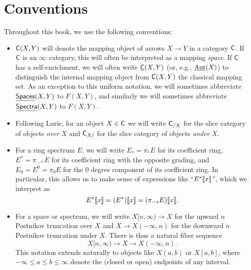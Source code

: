 
\section{Conventions}

Throughout this book, we use the following conventions:

\begin{itemize}
\item $\mathsf{C}(X, Y)$ will denote the mapping object of arrows $X \to Y$ in a category $\mathsf{C}$.  If $\mathsf{C}$ is an $\infty$--category, this will often be interpreted as a mapping \emph{space}.  If $\mathsf{C}$ has a self-enrichment, we will often write $\underline{\mathsf{C}}(X, Y)$ (or, e.g., $\operatorname{\underline{\smash{\operatorname{Aut}}}}(X)$) to distinguish the internal mapping object from $\mathsf{C}(X, Y)$ the classical mapping set.  As an exception to this uniform notation, we will sometimes abbreviate $\underline{\mathsf{Spaces}}(X, Y)$ to $F(X, Y)$, and similarly we will sometimes abbreviate $\underline{\mathsf{Spectra}}(X, Y)$ to $F(X, Y)$.
\item Following Lurie, for an object $X \in \mathsf{C}$ we will write $\mathsf{C}_{/X}$ for the slice category of objects \emph{over} $X$ and $\mathsf{C}_{X/}$ for the slice category of objects \emph{under} $X$.
\item For a ring spectrum $E$, we will write $E_* = \pi_* E$ for its coefficient ring, $E^* = \pi_{-*} E$ for its coefficient ring with the opposite grading, and $E_0 = E^0 = \pi_0 E$ for the $0${\th} degree component of its coefficient ring.  In particular, this allows us to make sense of expressions like ``$E^*\llbracket{x}\rrbracket$'', which we interpret as \[E^*\llbracket{x}\rrbracket = (E^*)\llbracket{x}\rrbracket = (\pi_{-*} E)\llbracket{x}\rrbracket.\]
\item For a space or spectrum, we will write $X[n, \infty) \to X$ for the upward $n${\th} Postnikov truncation over $X$ and $X \to X(-\infty, n)$ for the downward $n${\th} Postnikov truncation under $X$.  There is thus a natural fiber sequence \[X[n, \infty) \to X \to X(-\infty, n).\]  This notation extends naturally to objects like $X(a, b)$ or $X[a, b]$, where $-\infty \le a \le b \le \infty$ denote the (closed or open) endpoints of any interval.
\end{itemize}
